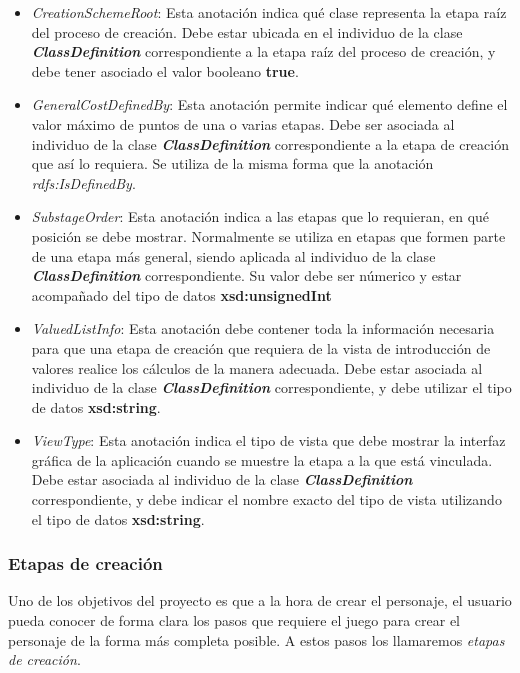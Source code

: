 \begin{itemize}
\begin{itemize}
        \item \textit{CreationSchemeRoot}: Esta anotación indica qué clase representa la etapa raíz del proceso de creación. 
        Debe estar ubicada en el individuo de la clase \textit{\textbf{ClassDefinition}} correspondiente a la etapa raíz del 
        proceso de creación, y debe tener asociado el valor booleano \textbf{true}.

        \item \textit{GeneralCostDefinedBy}: Esta anotación permite indicar qué elemento define el valor máximo de 
        puntos de una o varias etapas. Debe ser asociada al individuo de la clase \textit{\textbf{ClassDefinition}} correspondiente 
        a la etapa de creación que así lo requiera. Se utiliza de la misma forma que la anotación \textit{rdfs:IsDefinedBy}.

        \item \textit{SubstageOrder}: Esta anotación indica a las etapas que lo requieran, en qué posición se debe mostrar. 
        Normalmente se utiliza en etapas que formen parte de una etapa más general, siendo aplicada al individuo de la clase 
        \textit{\textbf{ClassDefinition}} correspondiente. Su valor debe ser númerico 
        y estar acompañado del tipo de datos \textbf{xsd:unsignedInt}
        
        \item \textit{ValuedListInfo}: Esta anotación debe contener toda la información necesaria para que una etapa de creación 
        que requiera de la vista de introducción de valores realice los cálculos de la manera adecuada. Debe estar asociada 
        al individuo de la clase \textit{\textbf{ClassDefinition}} correspondiente, y debe utilizar el tipo de datos \textbf{xsd:string}.
        
        \item \textit{ViewType}: Esta anotación indica el tipo de vista que debe mostrar la interfaz gráfica de la aplicación 
        cuando se muestre la etapa a la que está vinculada. Debe estar asociada al individuo de la clase 
        \textit{\textbf{ClassDefinition}} correspondiente, y debe indicar el nombre exacto del tipo de vista utilizando
        el tipo de datos \textbf{xsd:string}.
        
    \end{itemize}
\end{itemize}


\subsubsection{Etapas de creación}
Uno de los objetivos del proyecto es que a la hora de crear el personaje, el usuario pueda conocer de forma clara los 
pasos que requiere el juego para crear el personaje de la forma más completa posible. A estos pasos los llamaremos 
\textit{etapas de creación}.\medskip

